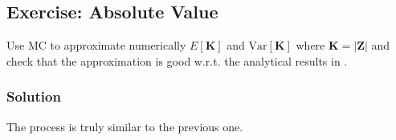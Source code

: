 \documentclass[letterpaper,10pt,english]{jupyterBook}
\begin{document}
\subsection{Exercise: Absolute Value}
\label{\detokenize{01:exercise-absolute-value}}
\sphinxAtStartPar
Use MC to approximate numerically \(E[ {\mathbf K}]\) and \(\mbox{Var}[ {\mathbf K}]\) where \({\mathbf K} = |{\mathbf Z}|\) and check that the approximation is good w.r.t. the analytical results in .


\subsubsection{Solution}
\label{\detokenize{01:id4}}
\sphinxAtStartPar
The process is truly similar to the previous one.
\end{document}
